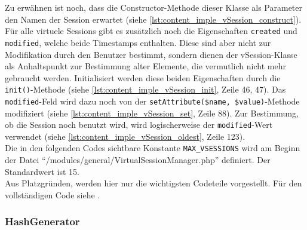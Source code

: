 Zu erwähnen ist noch, dass die Constructor-Methode dieser Klasse als Parameter den Namen der Session erwartet (siehe \autoref{lst:content_imple_vSession_construct}).\\
Für alle virtuele Sessions gibt es zusätzlich noch die Eigenschaften \texttt{created} und \texttt{modified}, welche beide Timestamps enthalten. Diese sind aber nicht zur Modifikation durch den Benutzer bestimmt, sondern dienen der vSession-Klasse als Anhaltspunkt zur Bestimmung alter Elemente, die vermutlich nicht mehr gebraucht werden. Initialisiert werden diese beiden Eigenschaften durch die \texttt{init()}-Methode (siehe \autoref{lst:content_imple_vSession_init}, Zeile 46, 47). Das \texttt{modified}-Feld wird dazu noch von der \texttt{setAttribute(\$name, \$value)}-Methode modifiziert (siehe \autoref{lst:content_imple_vSession_set}, Zeile 88). Zur Bestimmung, ob die Session noch benutzt wird, wird logischerweise der \texttt{modified}-Wert verwendet (siehe \autoref{lst:content_imple_vSession_oldest}, Zeile 123).\\
Die in den folgenden Codes sichtbare Konstante \texttt{MAX\_VSESSIONS} wird am Beginn der Datei \enquote{/modules/general/VirtualSessionManager.php} definiert. Der Standardwert ist 15.\\




Aus Platzgründen, werden hier nur die wichtigsten Codeteile vorgestellt. Für den vollständigen Code siehe .

\subsubsection{HashGenerator}